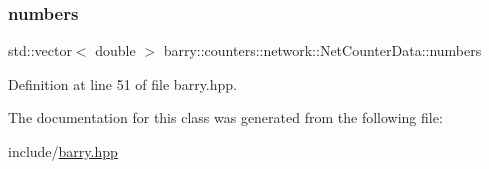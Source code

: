 \mbox{\label{classbarry_1_1counters_1_1network_1_1_net_counter_data_a720381c090feafdf9652f0ca19c5cc4b}} 
\subsubsection{\texorpdfstring{numbers}{numbers}}
{\footnotesize\ttfamily std\+::vector$<$ double $>$ barry\+::counters\+::network\+::\+Net\+Counter\+Data\+::numbers}



Definition at line 51 of file barry.\+hpp.



The documentation for this class was generated from the following file\+:\begin{DoxyCompactItemize}
\item 
include/\hyperlink{barry_8hpp}{barry.\+hpp}\end{DoxyCompactItemize}
